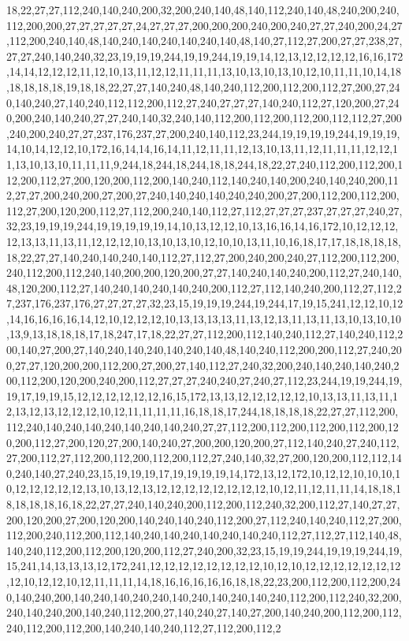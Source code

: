 18,22,27,27,112,240,140,240,200,32,200,240,140,48,140,112,240,140,48,240,200,240,112,200,200,27,27,27,27,27,24,27,27,27,200,200,200,240,200,240,27,27,240,200,24,27,112,200,240,140,48,140,240,140,240,140,240,140,48,140,27,112,27,200,27,27,238,27,27,27,240,140,240,32,23,19,19,19,244,19,19,244,19,19,14,12,13,12,12,12,12,16,16,172,14,14,12,12,12,11,12,10,13,11,12,12,11,11,11,13,10,13,10,13,10,12,10,11,11,10,14,18,18,18,18,18,19,18,18,22,27,27,140,240,48,140,240,112,200,112,200,112,27,200,27,240,140,240,27,140,240,112,112,200,112,27,240,27,27,27,140,240,112,27,120,200,27,240,200,240,140,240,27,27,240,140,32,240,140,112,200,112,200,112,200,112,112,27,200,240,200,240,27,27,237,176,237,27,200,240,140,112,23,244,19,19,19,19,244,19,19,19,14,10,14,12,12,10,172,16,14,14,16,14,11,12,11,11,12,13,10,13,11,12,11,11,11,12,12,11,13,10,13,10,11,11,11,9,244,18,244,18,244,18,18,244,18,22,27,240,112,200,112,200,112,200,112,27,200,120,200,112,200,140,240,112,140,240,140,200,240,140,240,200,112,27,27,200,240,200,27,200,27,240,140,240,140,240,240,200,27,200,112,200,112,200,112,27,200,120,200,112,27,112,200,240,140,112,27,112,27,27,27,237,27,27,27,240,27,32,23,19,19,19,244,19,19,19,19,19,14,10,13,12,12,10,13,16,16,14,16,172,10,12,12,12,12,13,13,11,13,11,12,12,12,10,13,10,13,10,12,10,10,13,11,10,16,18,17,17,18,18,18,18,18,22,27,27,140,240,140,240,140,112,27,112,27,200,240,200,240,27,112,200,112,200,240,112,200,112,240,140,200,200,120,200,27,27,140,240,140,240,200,112,27,240,140,48,120,200,112,27,140,240,140,240,140,240,200,112,27,112,140,240,200,112,27,112,27,237,176,237,176,27,27,27,27,32,23,15,19,19,19,244,19,244,17,19,15,241,12,12,10,12,14,16,16,16,16,14,12,10,12,12,12,10,13,13,13,13,11,13,12,13,11,13,11,13,10,13,10,10,13,9,13,18,18,18,17,18,247,17,18,22,27,27,112,200,112,140,240,112,27,140,240,112,200,140,27,200,27,140,240,140,240,140,240,140,48,140,240,112,200,200,112,27,240,200,27,27,120,200,200,112,200,27,200,27,140,112,27,240,32,200,240,140,240,140,240,200,112,200,120,200,240,200,112,27,27,27,240,240,27,240,27,112,23,244,19,19,244,19,19,17,19,19,15,12,12,12,12,12,12,16,15,172,13,13,12,12,12,12,12,10,13,13,11,13,11,12,13,12,13,12,12,12,10,12,11,11,11,11,16,18,18,17,244,18,18,18,18,22,27,27,112,200,112,240,140,240,140,240,140,240,140,240,27,27,112,200,112,200,112,200,112,200,120,200,112,27,200,120,27,200,140,240,27,200,200,120,200,27,112,140,240,27,240,112,27,200,112,27,112,200,112,200,112,200,112,27,240,140,32,27,200,120,200,112,112,140,240,140,27,240,23,15,19,19,19,17,19,19,19,19,14,172,13,12,172,10,12,12,10,10,10,10,12,12,12,12,12,13,10,13,12,13,12,12,12,12,12,12,12,12,10,12,11,12,11,11,14,18,18,18,18,18,18,16,18,22,27,27,240,140,240,200,112,200,112,240,32,200,112,27,140,27,27,200,120,200,27,200,120,200,140,240,140,240,112,200,27,112,240,140,240,112,27,200,112,200,240,112,200,112,140,240,140,240,140,240,140,240,112,27,112,27,112,140,48,140,240,112,200,112,200,120,200,112,27,240,200,32,23,15,19,19,244,19,19,19,244,19,15,241,14,13,13,13,12,172,241,12,12,12,12,12,12,12,12,10,12,10,12,12,12,12,12,12,12,12,10,12,12,10,12,11,11,11,14,18,16,16,16,16,16,18,18,22,23,200,112,200,112,200,240,140,240,200,140,240,140,240,240,140,240,140,240,140,240,112,200,112,240,32,200,240,140,240,200,140,240,112,200,27,140,240,27,140,27,200,140,240,200,112,200,112,240,112,200,112,200,140,240,140,240,112,27,112,200,112,2